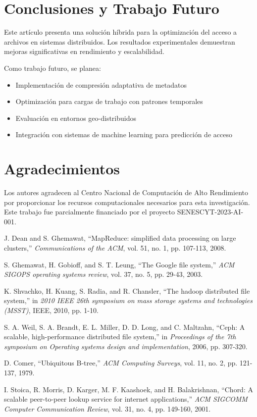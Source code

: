 \documentclass[conference]{IEEEtran}
\begin{document}
\section{Conclusiones y Trabajo Futuro}

Este artículo presenta una solución híbrida para la optimización del acceso a archivos en sistemas distribuidos. Los resultados experimentales demuestran mejoras significativas en rendimiento y escalabilidad.

Como trabajo futuro, se planea:
\begin{itemize}
\item Implementación de compresión adaptativa de metadatos
\item Optimización para cargas de trabajo con patrones temporales
\item Evaluación en entornos geo-distribuidos
\item Integración con sistemas de machine learning para predicción de acceso
\end{itemize}

\section{Agradecimientos}

Los autores agradecen al Centro Nacional de Computación de Alto Rendimiento por proporcionar los recursos computacionales necesarios para esta investigación. Este trabajo fue parcialmente financiado por el proyecto SENESCYT-2023-AI-001.

\begin{thebibliography}{00}
 J. Dean and S. Ghemawat, ``MapReduce: simplified data processing on large clusters,'' \textit{Communications of the ACM}, vol. 51, no. 1, pp. 107-113, 2008.

 S. Ghemawat, H. Gobioff, and S. T. Leung, ``The Google file system,'' \textit{ACM SIGOPS operating systems review}, vol. 37, no. 5, pp. 29-43, 2003.

 K. Shvachko, H. Kuang, S. Radia, and R. Chansler, ``The hadoop distributed file system,'' in \textit{2010 IEEE 26th symposium on mass storage systems and technologies (MSST)}, IEEE, 2010, pp. 1-10.

 S. A. Weil, S. A. Brandt, E. L. Miller, D. D. Long, and C. Maltzahn, ``Ceph: A scalable, high-performance distributed file system,'' in \textit{Proceedings of the 7th symposium on Operating systems design and implementation}, 2006, pp. 307-320.

 D. Comer, ``Ubiquitous B-tree,'' \textit{ACM Computing Surveys}, vol. 11, no. 2, pp. 121-137, 1979.

 I. Stoica, R. Morris, D. Karger, M. F. Kaashoek, and H. Balakrishnan, ``Chord: A scalable peer-to-peer lookup service for internet applications,'' \textit{ACM SIGCOMM Computer Communication Review}, vol. 31, no. 4, pp. 149-160, 2001.

\end{thebibliography}
\vspace{12pt}
\end{document}
